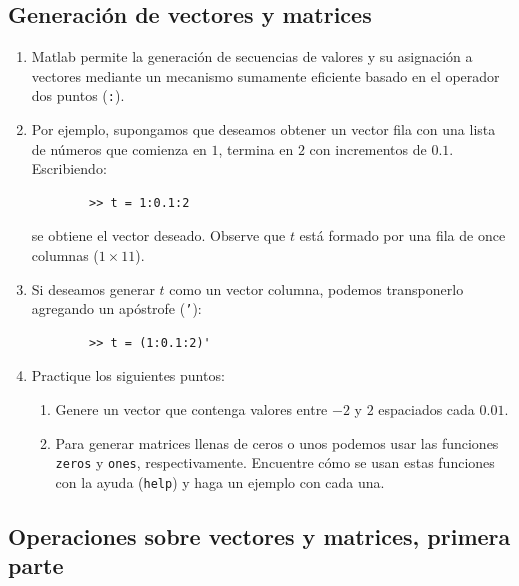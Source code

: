 \subsection{Generación de vectores y matrices}

\begin{enumerate}
	\item Matlab permite la generación de secuencias de valores y su asignación a vectores mediante un mecanismo sumamente eficiente basado en el operador dos puntos (\texttt{:}).
	\item Por ejemplo, supongamos que deseamos obtener un vector fila con una lista de números que comienza en $1$, termina en $2$ con incrementos de $0.1$. Escribiendo:
	\begin{verbatim}
		>> t = 1:0.1:2
	\end{verbatim}
	se obtiene el vector deseado. Observe que $t$ está formado por una fila de once columnas ($1 \times 11$).
	
	\item Si deseamos generar $t$ como un vector columna, podemos transponerlo agregando un apóstrofe (\texttt{'}):
	\begin{verbatim}
		>> t = (1:0.1:2)'
	\end{verbatim}
	
	\item Practique los siguientes puntos:
	\begin{enumerate}
		\item Genere un vector que contenga valores entre $-2$ y $2$ espaciados cada $0.01$.
		\item Para generar matrices llenas de ceros o unos podemos usar las funciones \texttt{zeros} y \texttt{ones}, respectivamente. Encuentre cómo se usan estas funciones con la ayuda (\texttt{help}) y haga un ejemplo con cada una.
	\end{enumerate}
\end{enumerate}

\subsection{Operaciones sobre vectores y matrices, primera parte}

